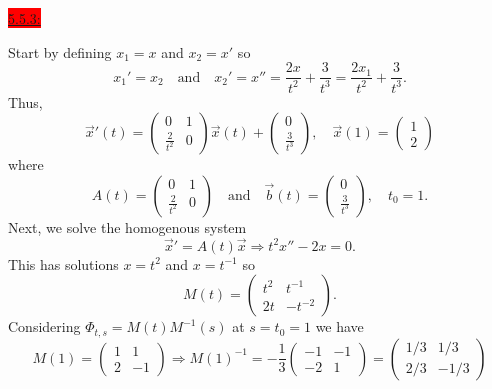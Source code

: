 \documentclass{exam}
\begin{document}
\colorbox{red}{\underline{5.5.3:}}
\begin{solution}
    Start by defining $x_1 = x$ and $x_2 = x'$ so 
    \[
        x_1' = x_2 \quad\text{and}\quad x_2' = x'' = \frac{2x}{t^2} + \frac{3}{t^3} = \frac{2x_1}{t^2} + \frac{3}{t^3}. 
    \]
    Thus, 
    \[
        \vec{x}'(t) = \begin{pmatrix}
            0 & 1 \\
            \frac{2}{t^2} & 0 
        \end{pmatrix}\vec{x}(t) + \begin{pmatrix}
            0 \\ \frac{3}{t^3}
        \end{pmatrix}, \quad \vec{x}(1) = \begin{pmatrix}
            1 \\ 2
        \end{pmatrix}
    \]
    where 
    \[
        A(t) = \begin{pmatrix}
            0 & 1 \\
            \frac{2}{t^2} & 0 
        \end{pmatrix}
        \quad\text{and}\quad 
        \vec{b}(t) = \begin{pmatrix}
            0 \\ \frac{3}{t^3}
        \end{pmatrix}, \quad t_0 = 1.
    \]
    Next, we solve the homogenous system 
    \[
        \vec{x}' = A(t)\vec{x} \Rightarrow t^2 x'' - 2x = 0.
    \]
    This has solutions $x = t^2$ and $x = t^{-1}$ so 
    \[
        M(t) = \begin{pmatrix}
            t^2 & t^{-1} \\
            2t & -t^{-2}
        \end{pmatrix}.
    \]
    Considering $\Phi_{t,s} = M(t)M^{-1}(s)$ at $s = t_0 = 1$ we have 
    \[
        M(1) = \begin{pmatrix}
            1 & 1 \\
            2 & -1
        \end{pmatrix}
        \Rightarrow M(1)^{-1} = -\frac{1}{3}\begin{pmatrix}
            -1 & -1 \\
            -2 & 1
        \end{pmatrix} 
        = \begin{pmatrix}
            1/3 & 1/3 \\
            2/3 & -1/3
        \end{pmatrix}
\]
\end{solution}
\end{document}
